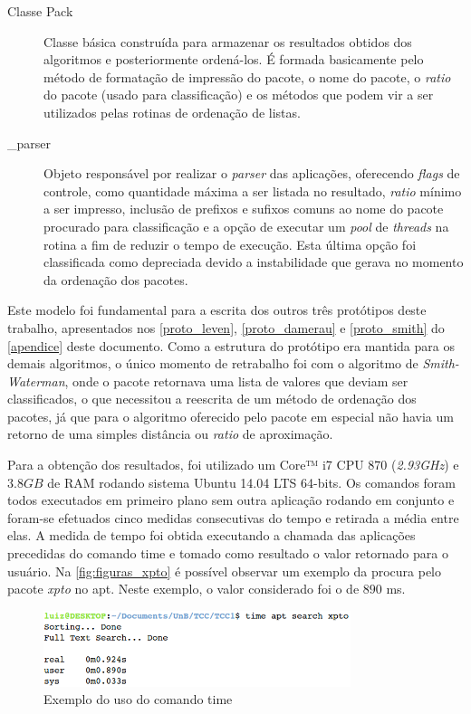 \begin{description}
	\item[Classe Pack] Classe básica construída para armazenar os resultados obtidos dos algoritmos e posteriormente ordená-los. É formada basicamente pelo método de formatação de impressão do pacote, o nome do pacote, o \textit{ratio} do pacote (usado para classificação) e os métodos que podem vir a ser utilizados pelas rotinas de ordenação de listas.
	\item [\_parser] Objeto responsável por realizar o \textit{parser} das aplicações, oferecendo \textit{flags} de controle, como quantidade máxima a ser listada no resultado, \textit{ratio} mínimo a ser impresso, inclusão de prefixos e sufixos comuns ao nome do pacote procurado para classificação e a opção de executar um \textit{pool} de \textit{threads} na rotina a fim de reduzir o tempo de execução. Esta última opção foi classificada como depreciada devido a instabilidade que gerava no momento da ordenação dos pacotes.
\end{description}


Este modelo foi fundamental para a escrita dos outros três protótipos deste trabalho, apresentados nos \autoref{proto_leven}, \autoref{proto_damerau} e \autoref{proto_smith} do \autoref{apendice} deste documento. Como a estrutura do protótipo era mantida para os demais algoritmos, o único momento de retrabalho foi com o algoritmo de \textit{Smith-Waterman}, onde o pacote retornava uma lista de valores que deviam ser classificados, o que  necessitou a reescrita de um método de ordenação dos pacotes, já que para o algoritmo oferecido pelo pacote em especial não havia um retorno de uma simples distância ou \textit{ratio} de aproximação.


Para a obtenção dos resultados, foi utilizado um {\code Core™ i7 CPU 870} (\textit{2.93GHz})  e $3.8GB$ de RAM rodando sistema Ubuntu 14.04 LTS 64-bits. Os comandos foram todos executados em primeiro plano sem outra aplicação rodando em conjunto e foram-se efetuados cinco medidas consecutivas do tempo e retirada a média entre elas. A medida de tempo foi obtida executando a chamada das aplicações precedidas do comando {\code time} e tomado como resultado o valor retornado para o usuário. Na \autoref{fig:figuras_xpto} é possível observar um exemplo da procura pelo pacote \textit{xpto} no {\code apt}. Neste exemplo, o valor considerado foi o de $890$ ms.

\begin{figure}[htbp]
  \centering
	\includegraphics[width=0.8\textwidth]{figuras/xpto}
  \caption{Exemplo do uso do comando {\code time}}
  \label{fig:figuras_xpto}
\end{figure}

